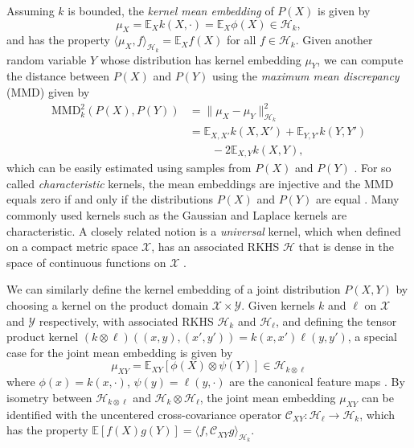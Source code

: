 \documentclass[twocolumn]{article}
\theoremstyle{definition}
\begin{document}
Assuming $k$ is bounded, the \emph{kernel mean embedding} of $P(X)$ is given by
\begin{equation*}
    \mu_{X} = \mathbb{E}_X k(X, \cdot) = \mathbb{E}_X \phi(X) \in \mathcal{H}_k,
\end{equation*}
and has the property $\langle \mu_{X}, f \rangle_{\mathcal{H}_k} = \mathbb{E}_X f(X)$ for all $f \in \mathcal{H}_k$. Given another random variable $Y$ whose distribution has kernel embedding $\mu_{Y}$, we can compute the distance between $P(X)$ and $P(Y)$ using the \emph{maximum mean discrepancy} (MMD) given by
\begin{align*}
    \text{MMD}_k^2(P(X), P(Y)) &= \| \mu_{X} - \mu_{Y} \|_{\mathcal{H}_k}^2 \\
    &= \mathbb{E}_{X, X'} k(X, X') + \mathbb{E}_{Y, Y'} k(Y, Y') \\ & \qquad -2\mathbb{E}_{X, Y} k(X, Y), 
\end{align*}
which can be easily estimated using samples from $P(X)$ and $P(Y)$ \cite{Gretton_2012}. For so called \emph{characteristic} kernels, the mean embeddings are injective and the MMD equals zero if and only if the distributions $P(X)$ and $P(Y)$ are equal \citep{Fukumizu_2007}. Many commonly used kernels such as the Gaussian and Laplace kernels are characteristic. A closely related notion is a \emph{universal} kernel, which when defined on a compact metric space $\mathcal{X}$, has an associated RKHS $\mathcal{H}$ that is dense in the space of continuous functions on $\mathcal{X}$ \citep{sriperumbudurUniversalityCharacteristicKernels2011}.

We can similarly define the kernel embedding of a joint distribution $P(X, Y)$ by choosing a kernel on the product domain $\mathcal{X} \times \mathcal{Y}$. Given kernels $k$ and $\ell$ on $\mathcal{X}$ and $\mathcal{Y}$ respectively, with associated RKHS $\mathcal{H}_k$ and $\mathcal{H}_\ell$, and defining the tensor product kernel $(k \otimes \ell)((x,y),(x',y')) = k(x,x')\ell(y,y')$, a special case for the joint mean embedding is given by
\begin{equation*}
    \mu_{X Y} = \mathbb{E}_{XY} [\phi(X) \otimes \psi(Y)] \in \mathcal{H}_{k\otimes \ell}
\end{equation*}
where $\phi(x) = k(x, \cdot)$, $\psi(y) = \ell(y, \cdot)$ are the canonical feature maps \citep{Fukumizu_2004}. By isometry between $\mathcal{H}_{k\otimes \ell}$ and $\mathcal{H}_{k}\otimes \mathcal{H}_\ell$, the joint mean embedding $\mu_{XY}$ can be identified with the uncentered cross-covariance operator $\mathcal{C}_{XY}: \mathcal{H}_\ell \to \mathcal{H}_k$, which has the property $\mathbb E[f(X)g(Y)] = \langle f , \mathcal{C}_{XY}g \rangle_{\mathcal{H}_k}$.
\end{document}

